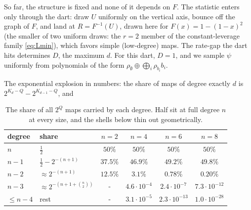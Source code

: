 \documentclass[11pt]{article}
\begin{document}
\begin{example}
\begin{center}
\end{center}

So far, the structure is fixed and none of it depends on $F$.
The statistic enters only through the dart: draw $U$ uniformly on
the vertical axis, bounce off the graph of $F$, and land at
$R = F^{-1}(U)$, drawn here for $F(x) = 1-(1-x)^2$ (the smaller
of two uniform draws: the $r = 2$ member of the
constant-leverage family \eqref{eq:Lmin}), which favors simple (low-degree) maps.
The rate-gap the dart hits determines $D$, the maximum $d$. For this dart, $D=1$,
and we sample $\psi$ uniformly from polynomials of the form $\rho_\emptyset \oplus \bigoplus_i \rho_{b_i}b_i$.

\end{example}

The exponential explosion in numbers: the share of maps of degree
exactly $d$ is $2^{K_d - Q} - 2^{K_{d-1} - Q}$, and

\begin{table}[H]
\begin{center}
\begin{tabular}{l l cccc}
\toprule
degree & share & $n=2$ & $n=4$ & $n=6$ & $n=8$ \\
\midrule
$n$ & $\tfrac12$
  & $50\%$ & $50\%$ & $50\%$ & $50\%$ \\
$n-1$ & $\tfrac12 - 2^{-(n+1)}$
  & $37.5\%$ & $46.9\%$ & $49.2\%$ & $49.8\%$ \\
$n-2$ & $\approx 2^{-(n+1)}$
  & $12.5\%$ & $3.1\%$ & $0.78\%$ & $0.20\%$ \\
$n-3$ & $\approx 2^{-(n+1+\binom n2)}$
  & - & $4.6\cdot10^{-4}$ & $2.4\cdot10^{-7}$ & $7.3\cdot10^{-12}$ \\
$\le n-4$ & rest
  & - & $3.1\cdot10^{-5}$ & $2.3\cdot10^{-13}$ & $1.0\cdot10^{-28}$ \\
\bottomrule
\end{tabular}
\end{center}
\caption{The share of all $2^Q$ maps carried by each degree. Half sit at full degree $n$ at every size, and the shells below thin out geometrically.}
\label{tab:degreeshare}
\end{table}
\end{document}

